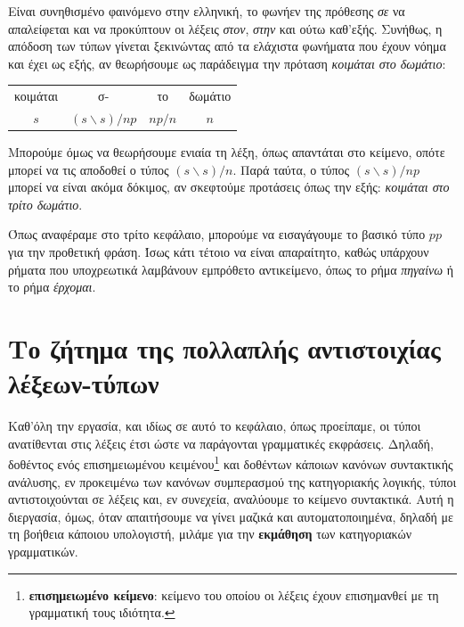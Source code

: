 \documentclass [a4paper,11pt] {book}
\theoremstyle{definition}
\theoremstyle{definition}
\newenvironment{remark}[1][Παρατήρηση]{\begin{trivlist}
\item[\hskip \labelsep {\bfseries #1}]}{\end{trivlist}}
\begin{document}
Είναι συνηθισμένο φαινόμενο στην ελληνική, το φωνήεν της πρόθεσης \textit{σε} να απαλείφεται και να προκύπτουν οι λέξεις \textit{στον}, \textit{στην} και ούτω καθ'εξής. Συνήθως, η απόδοση των τύπων γίνεται ξεκινώντας από τα ελάχιστα φωνήματα που έχουν νόημα και έχει ως εξής, αν θεωρήσουμε ως παράδειγμα την πρόταση \textit{κοιμάται στο δωμάτιο}:
\begin{center}
\begin{tabular}{cccc}
κοιμάται & σ- & το & δωμάτιο \\
$s$ & $(s\backslash s)/np$ & $np/n$ & $n$
\end{tabular}
\end{center}
Μπορούμε όμως να θεωρήσουμε ενιαία τη λέξη, όπως απαντάται στο κείμενο, οπότε μπορεί να τις αποδοθεί ο τύπος $(s\backslash s)/n$. Παρά ταύτα, ο τύπος $(s\backslash s)/np$ μπορεί να είναι ακόμα δόκιμος, αν σκεφτούμε προτάσεις όπως την εξής: \textit{κοιμάται στο τρίτο δωμάτιο}.
\begin{remark}
Όπως αναφέραμε στο τρίτο κεφάλαιο, μπορούμε να εισαγάγουμε το βασικό τύπο $pp$ για την προθετική φράση. Ίσως κάτι τέτοιο να είναι απαραίτητο, καθώς υπάρχουν ρήματα που υποχρεωτικά λαμβάνουν εμπρόθετο αντικείμενο, όπως το ρήμα \textit{πηγαίνω} ή το ρήμα \textit{έρχομαι}.
\end{remark}
\section{Το ζήτημα της πολλαπλής αντιστοιχίας λέξεων-τύπων}
Καθ'όλη την εργασία, και ιδίως σε αυτό το κεφάλαιο, όπως προείπαμε, οι τύποι ανατίθενται στις λέξεις έτσι ώστε να παράγονται γραμματικές εκφράσεις. Δηλαδή, δοθέντος ενός επισημειωμένου κειμένου\footnote{\textbf{επισημειωμένο κείμενο}: κείμενο του οποίου οι λέξεις έχουν επισημανθεί με τη γραμματική τους ιδιότητα.} και δοθέντων κάποιων κανόνων συντακτικής ανάλυσης, εν προκειμένω των κανόνων συμπερασμού της κατηγοριακής λογικής, τύποι αντιστοιχούνται σε λέξεις και, εν συνεχεία, αναλύουμε το κείμενο συντακτικά. Αυτή η διεργασία, όμως, όταν απαιτήσουμε να γίνει μαζικά και αυτοματοποιημένα, δηλαδή με τη βοήθεια κάποιου υπολογιστή, μιλάμε για την \textbf{εκμάθηση} των κατηγοριακών γραμματικών.
\end{document}
